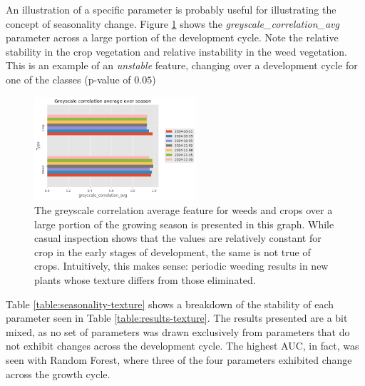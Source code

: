\documentclass[letterpaper]{report}
\begin{document}
An illustration of a specific parameter is probably useful for illustrating the concept of seasonality change. Figure \ref{fig:season-texture-correlation} shows the \textit{greyscale\_correlation\_avg} parameter across a large portion of the development cycle. Note the relative stability in the crop vegetation and relative instability in the weed vegetation. This is an example of an \textit{unstable} feature, changing over a development cycle for one of the classes (p-value of $0.05$)


\begin{figure}[H]
	\centering
	\includegraphics[width=6cm]{./figures/plot-over-season.png}
	\caption[Greyscale Correlation Average over growing season]{The greyscale correlation average feature for weeds and crops over a large portion of the growing season is presented in this graph. While casual inspection shows that the values are relatively constant for crop in the early stages of development, the same is not true of crops. Intuitively, this makes sense: periodic weeding results in new plants whose texture differs from those eliminated.}
	\label{fig:season-texture-correlation}
\end{figure}
 
 Table \ref{table:seasonality-texture} shows a breakdown of the stability of each parameter seen in Table \ref{table:results-texture}. The results presented are a bit mixed, as no set of parameters was drawn exclusively from parameters that do not exhibit changes across the development cycle. The highest AUC, in fact, was seen with Random Forest, where three of the four parameters exhibited change across the growth cycle.
 
 {
\renewcommand{\arraystretch}{1.2}




}
\end{document}
